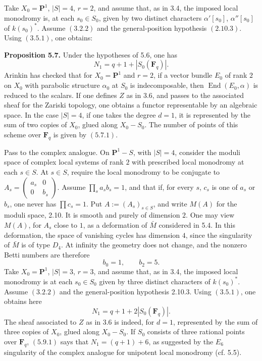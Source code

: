 \documentclass[11pt]{article}
\newcommand{\Fq}{\mathbf F_q}
\newcommand{\End}{\operatorname{End}}
\begin{document}
Take \(X_0=\mathbf P^1\), \(|S|=4\), \(r=2\), and assume that, as in 3.4, the imposed local monodromy is, at each \(s_0\in S_0\), given by two distinct characters \(\alpha'[s_0]\), \(\alpha''[s_0]\) of \(k(s_0)^*\). Assume \((3.2.2)\) and the general-position hypothesis \((2.10.3)\). Using \((3.5.1)\), one obtains:

\textbf{Proposition 5.7.} Under the hypotheses of 5.6, one has
\begin{equation}\tag{5.7.1}
N_1=q+1+|S_0(\Fq)|.
\end{equation}
Arinkin has checked that for \(X_0=\mathbf P^1\) and \(r=2\), if a vector bundle \(E_0\) of rank \(2\) on \(X_0\) with parabolic structure \(\alpha_0\) at \(S_0\) is indecomposable, then \(\End(E_0,\alpha)\) is reduced to the scalars. If one defines \(Z\) as in 3.6, and passes to the associated sheaf for the Zariski topology, one obtains a functor representable by an algebraic space. In the case \(|S|=4\), if one takes the degree \(d=1\), it is represented by the sum of two copies of \(X_0\), glued along \(X_0-S_0\). The number of points of this scheme over \(\Fq\) is given by \((5.7.1)\).

Pass to the complex analogue. On \(\mathbf P^1-S\), with \(|S|=4\), consider the moduli space of complex local systems of rank \(2\) with prescribed local monodromy at each \(s\in S\). At \(s\in S\), require the local monodromy to be conjugate to \(A_s=\begin{pmatrix}a_s&0\\0&b_s\end{pmatrix}\). Assume \(\prod_s a_sb_s=1\), and that if, for every \(s\), \(c_s\) is one of \(a_s\) or \(b_s\), one never has \(\prod c_s=1\). Put \(A:=(A_s)_{s\in S}\), and write \(M(A)\) for the moduli space, 2.10. It is smooth and purely of dimension \(2\). One may view \(M(A)\), for \(A_s\) close to \(1\), as a deformation of \(\bar M\) considered in 5.4. In this deformation, the space of vanishing cycles has dimension \(4\), since the singularity of \(\bar M\) is of type \(D_4\). At infinity the geometry does not change, and the nonzero Betti numbers are therefore
\begin{equation}\tag{5.8.1}
b_0=1,\qquad b_2=5.
\end{equation}
Take \(X_0=\mathbf P^1\), \(|S|=3\), \(r=3\), and assume that, as in 3.4, the imposed local monodromy is at each \(s_0\in S_0\) given by three distinct characters of \(k(s_0)^*\). Assume \((3.2.2)\) and the general-position hypothesis 2.10.3. Using \((3.5.1)\), one obtains here
\begin{equation}\tag{5.9.1}
N_1=q+1+2|S_0(\Fq)|.
\end{equation}
The sheaf associated to \(Z\) as in 3.6 is indeed, for \(d=1\), represented by the sum of three copies of \(X_0\), glued along \(X_0-S_0\). If \(S_0\) consists of three rational points over \(\Fq\), \((5.9.1)\) says that \(N_1=(q+1)+6\), as suggested by the \(E_6\) singularity of the complex analogue for unipotent local monodromy (cf. 5.5).
\end{document}
